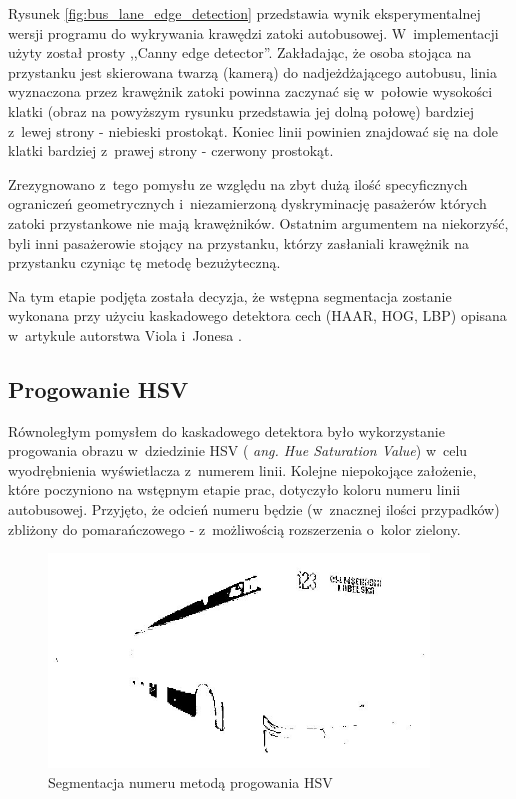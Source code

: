 Rysunek \ref{fig:bus_lane_edge_detection} przedstawia wynik 
eksperymentalnej wersji programu do
wykrywania krawędzi zatoki autobusowej. W~implementacji użyty
został prosty ,,Canny edge detector''. Zakładając, że osoba stojąca
na przystanku jest skierowana twarzą (kamerą) do nadjeżdżającego autobusu,
linia wyznaczona przez krawężnik zatoki powinna zaczynać się w~połowie
wysokości klatki (obraz na powyższym rysunku przedstawia jej dolną
połowę) bardziej z~lewej strony - niebieski prostokąt. Koniec linii
powinien znajdować się na dole klatki bardziej z~prawej strony - czerwony
prostokąt.

Zrezygnowano z~tego pomysłu ze względu na zbyt dużą ilość 
specyficznych
ograniczeń geometrycznych i~niezamierzoną dyskryminację pasażerów
których zatoki przystankowe nie mają krawężników. Ostatnim argumentem
na niekorzyść, 
byli inni pasażerowie stojący na przystanku, którzy
zasłaniali krawężnik na przystanku czyniąc tę metodę bezużyteczną.

Na tym etapie podjęta została decyzja, że wstępna segmentacja
zostanie wykonana przy użyciu kaskadowego detektora cech (HAAR, HOG, LBP)
opisana w~artykule autorstwa Viola i~Jonesa \cite{DBLP:conf/cvpr/ViolaJ01}.

\subsection{Progowanie HSV}

Równoległym pomysłem do kaskadowego detektora było 
wykorzystanie progowania obrazu w~dziedzinie HSV (\textit{
ang. Hue Saturation Value})
w~celu wyodrębnienia wyświetlacza z~numerem linii. 
Kolejne niepokojące założenie, które poczyniono
na wstępnym etapie prac, dotyczyło koloru numeru linii autobusowej.
Przyjęto, że odcień numeru będzie (w~znacznej ilości przypadków) 
zbliżony do pomarańczowego - z~możliwością rozszerzenia o~kolor
zielony. 

\begin{figure}[h!]
    \centering
    \includegraphics[width=0.9\textwidth]{img/exp_hsv_threshold_number_detector}
    \caption{Segmentacja numeru metodą progowania HSV}
\end{figure}

